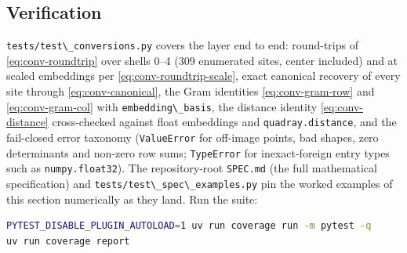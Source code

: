 \documentclass[
  10pt,
]{article}
\newcommand{\passthrough}[1]{#1}
\begin{document}
\subsection{Verification}\label{verification}

\passthrough{\lstinline!tests/test\_conversions.py!} covers the layer
end to end: round-trips of \eqref{eq:conv-roundtrip} over shells 0--4
(309 enumerated sites, center included) and at scaled embeddings per
\eqref{eq:conv-roundtrip-scale}, exact canonical recovery of every site
through \eqref{eq:conv-canonical}, the Gram identities
\eqref{eq:conv-gram-row} and \eqref{eq:conv-gram-col} with
\passthrough{\lstinline!embedding\_basis!}, the distance identity
\eqref{eq:conv-distance} cross-checked against float embeddings and
\passthrough{\lstinline!quadray.distance!}, and the fail-closed error
taxonomy (\passthrough{\lstinline!ValueError!} for off-image points, bad
shapes, zero determinants and non-zero row sums;
\passthrough{\lstinline!TypeError!} for inexact-foreign entry types such
as \passthrough{\lstinline!numpy.float32!}). The repository-root
\passthrough{\lstinline!SPEC.md!} (the full mathematical specification)
and \passthrough{\lstinline!tests/test\_spec\_examples.py!} pin the
worked examples of this section numerically as they land. Run the suite:

\begin{lstlisting}[language=bash]
PYTEST_DISABLE_PLUGIN_AUTOLOAD=1 uv run coverage run -m pytest -q
uv run coverage report
\end{lstlisting}
\end{document}
